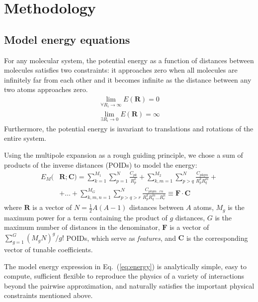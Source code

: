 \documentclass[aip,jcp,reprint,amsmath,amssymb,nature]{revtex4-1}
\begin{document}
\section{Methodology}

\subsection{Model energy equations}

For any molecular system, the potential energy as a function of distances between molecules satisfies two constraints: it approaches zero when all molecules are infinitely far from each other and it becomes infinite as the distance between any two atoms approaches zero.
%
\begin{eqnarray}
\lim_{\forall R_i \rightarrow \infty} E (\mathbf{R}) = 0 \\
\lim_{\exists R_i \rightarrow 0} E (\mathbf{R}) = \infty
\end{eqnarray}
%
Furthermore, the potential energy is invariant to translations and rotations of the entire system.

Using the multipole expansion as a rough guiding principle, we chose a sum of products of the inverse distances (POIDs) to model the  energy: 
%
\begin{equation}
\begin{split}
E_M (&\mathbf{R}; \mathbf{C}) = \sum_{k=1}^{M_1} \sum_{p=1}^{N} \frac{C_{pk}}{R_p^k} + \sum_{k,m=1}^{M_2} \sum_{p>q}^{N} \frac{C_{pkqm}}{R_p^k R_q^m} + \\
&+ \ldots +\sum_{k,m,n=1}^{M_G} \sum_{p>q>r}^{N} \frac{C_{pkqm\ldots rn}}{R_p^k R_q^m \ldots R_r^n} \equiv \mathbf{F}\cdot \mathbf{C} \label{eq:energy}
\end{split}
\end{equation}
%
where $\mathbf{R}$ is a vector of $N = \frac{1}{2}A(A-1)$ distances between $A$ atoms, $M_{g}$ is the maximum power for a term containing the product of $g$ distances, $G$ is the maximum number of distances in the denominator, $\mathbf{F}$ is a vector of $\sum_{g=1}^{G} (M_g N)^g /g!$ POIDs, which serve as \emph{features}, and $\mathbf{C}$ is the corresponding vector of tunable coefficients. 

The model energy expression in Eq.~(\ref{eq:energy}) is analytically simple, easy to compute, sufficient flexible to reproduce the physics of a variety of interactions beyond the pairwise approximation, and naturally satisfies the important physical constraints mentioned above.
\end{document}
